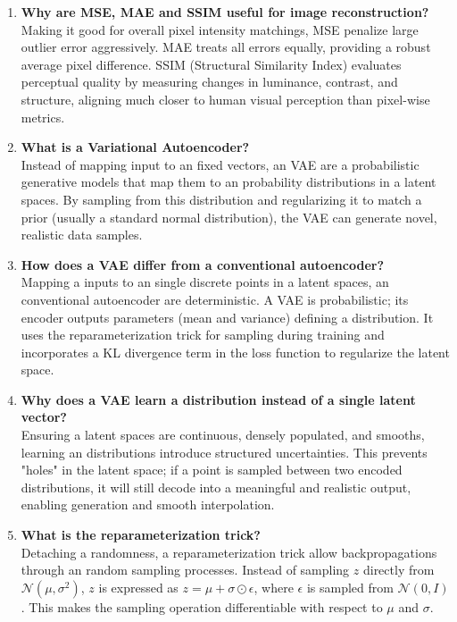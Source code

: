 \documentclass[10pt]{article}
\begin{document}
\begin{enumerate}
\item \textbf{Why are MSE, MAE and SSIM useful for image reconstruction?}\\
Making it good for overall pixel intensity matchings, MSE penalize large outlier error aggressively. MAE treats all errors equally, providing a robust average pixel difference. SSIM (Structural Similarity Index) evaluates perceptual quality by measuring changes in luminance, contrast, and structure, aligning much closer to human visual perception than pixel-wise metrics.

\item \textbf{What is a Variational Autoencoder?}\\
Instead of mapping input to an fixed vectors, an VAE are a probabilistic generative models that map them to an probability distributions in a latent spaces. By sampling from this distribution and regularizing it to match a prior (usually a standard normal distribution), the VAE can generate novel, realistic data samples.

\item \textbf{How does a VAE differ from a conventional autoencoder?}\\
Mapping a inputs to an single discrete points in a latent spaces, an conventional autoencoder are deterministic. A VAE is probabilistic; its encoder outputs parameters (mean and variance) defining a distribution. It uses the reparameterization trick for sampling during training and incorporates a KL divergence term in the loss function to regularize the latent space.

\item \textbf{Why does a VAE learn a distribution instead of a single latent vector?}\\
Ensuring a latent spaces are continuous, densely populated, and smooths, learning an distributions introduce structured uncertainties. This prevents "holes" in the latent space; if a point is sampled between two encoded distributions, it will still decode into a meaningful and realistic output, enabling generation and smooth interpolation.

\item \textbf{What is the reparameterization trick?}\\
Detaching a randomness, a reparameterization trick allow backpropagations through an random sampling processes. Instead of sampling $z$ directly from $\mathcal{N}(\mu, \sigma^2)$, $z$ is expressed as $z = \mu + \sigma \odot \epsilon$, where $\epsilon$ is sampled from $\mathcal{N}(0, I)$. This makes the sampling operation differentiable with respect to $\mu$ and $\sigma$.


\end{enumerate}
\end{document}
